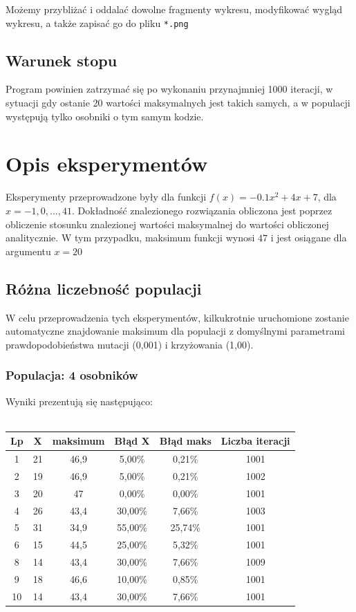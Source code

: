 \documentclass[a4paper,11pt]{article}
\begin{document}
			Możemy przybliżać i oddalać dowolne fragmenty wykresu, modyfikować wygląd wykresu, a także zapisać go do pliku \texttt{*.png}
			
		\subsection{Warunek stopu}
		Program powinien zatrzymać się po wykonaniu przynajmniej 1000 iteracji, w sytuacji gdy ostanie 20 wartości maksymalnych jest takich samych, a w populacji występują tylko osobniki o tym samym kodzie.
		
	\section{Opis eksperymentów}
	Eksperymenty przeprowadzone były dla funkcji $f(x) = -0.1x^2 + 4x + 7$, dla $x = -1, 0, ..., 41$. Dokładność znalezionego rozwiązania obliczona jest poprzez obliczenie stosunku znalezionej wartości maksymalnej do wartości obliczonej analitycznie. W tym przypadku, maksimum funkcji wynosi $47$ i jest osiągane dla argumentu $x = 20$
	
		\subsection{Różna liczebność populacji}
			W celu przeprowadzenia tych eksperymentów, kilkukrotnie uruchomione zostanie  automatyczne znajdowanie maksimum dla populacji z domyślnymi parametrami prawdopodobieństwa mutacji (0,001) i krzyżowania (1,00).
			\subsubsection{Populacja: 4 osobników}
				Wyniki prezentują się następująco:\\~\\
				\begin{tabular}{|c|c|c|c|c|c|}
					\hline 
					Lp & X & maksimum & Błąd X & Błąd maks & Liczba iteracji\\
					\hline
					1 & 21  & 46,9 & 5,00\%  & 0,21\% & 1001\\\hline
					2 & 19 & 46,9  & 5,00\% & 0,21\% & 1002\\\hline
					3 & 20  & 47   & 0,00\%  & 0,00\% & 1001\\\hline
					4 & 26 & 43,4  & 30,00\%  & 7,66\% & 1003\\\hline
					5 & 31 & 34,9  & 55,00\%  & 25,74\% & 1001\\\hline
					6 & 15 & 44,5  & 25,00\%  & 5,32\% & 1001\\\hline
					8 & 14 & 43,4  & 30,00\%  & 7,66\% & 1009\\\hline
					9 & 18 & 46,6  &  10,00\% & 0,85\% & 1001\\\hline
					10 & 14 & 43,4 & 30,00\% & 7,66\%& 1001\\\hline
				\end{tabular} 
\end{document}
